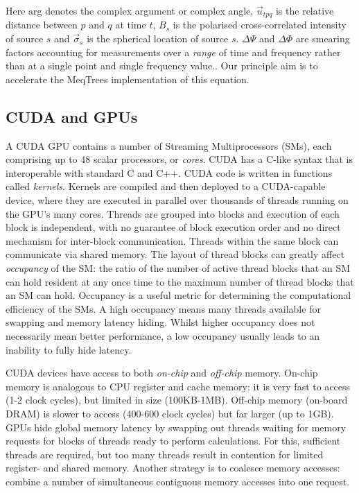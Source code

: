 Here $\mbox{arg}$ denotes the complex argument or complex angle, $\vec{u}_{tpq}$ is the relative distance between $p$ and $q$ at time $t$, $B_s$ is the polarised cross-correlated intensity of source $s$ and $\vec\sigma_s$ is the spherical location of source $s$. $\Delta\Psi$ and $\Delta\Phi$ are smearing factors accounting for measurements over a \emph{range} of time and frequency rather than at a single point and single frequency value.\citep{Smirnov2011, Taylor1999}. Our principle aim is to accelerate the MeqTrees implementation of this equation.



\subsection{CUDA and GPUs}

A CUDA GPU contains a number of Streaming Multiprocessors (SMs), each comprising up to 48 scalar processors, or \emph{cores}.   CUDA has a C-like syntax that is interoperable with standard C and C++. CUDA code is written in functions called \emph{kernels}.  Kernels are compiled and then deployed to a CUDA-capable device, where they are executed in parallel over thousands of threads running on the GPU's many cores.   Threads are grouped into blocks and execution of each block is independent, with no guarantee of block execution order and no direct mechanism for inter-block communication. Threads within the same block can communicate via shared memory.  The layout of thread blocks can greatly affect \emph{occupancy} of the SM: the ratio of the number of active thread blocks that an SM can hold resident at any once time to the maximum number of thread blocks that an SM can hold. Occupancy is a useful metric for determining the computational efficiency of the SMs. A high occupancy means many threads available  for swapping and memory latency hiding. Whilst higher occupancy does not necessarily mean better performance, a low occupancy usually leads to an inability to fully hide latency.

CUDA devices have access to both \emph{on-chip} and \emph{off-chip} memory. On-chip memory is analogous to CPU register and cache memory: it is very fast to access (1-2 clock cycles), but limited in size (100KB-1MB). Off-chip memory (on-board DRAM) is slower to access (400-600 clock cycles) but far larger (up to 1GB). GPUs hide global memory latency by swapping out threads waiting for memory requests for blocks of threads ready to perform calculations. For this, sufficient threads are required, but too many threads result in contention for limited register- and shared memory. Another strategy is to coalesce memory accesses:  combine a number of simultaneous contiguous memory accesses into one request.



